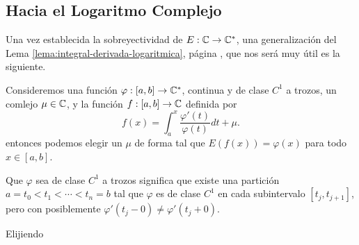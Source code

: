 \subsection{Hacia el Logaritmo Complejo}
Una vez establecida la sobreyectividad de \(E:\mathbb{C} \rightarrow \mathbb{C}^* \), una generalización del Lema \ref{lema:integral-derivada-logaritmica}, página 
\pageref{lema:integral-derivada-logaritmica}, que nos será muy útil es la siguiente.

\begin{theo}
    Consideremos una función \(\varphi : [a, b]\rightarrow \mathbb{C}^* \), continua y de clase \(C^1\) a trozos, un comlejo \(\mu \in \mathbb{C} \), y la función
    \(f: [a, b] \rightarrow \mathbb{C} \) definida por 
    \[
    \displaystyle f(x) = \int_{a}^{x} \frac{\varphi'(t)}{\varphi(t)} dt + \mu.
    \]
    entonces podemos elegir un \(\mu \) de forma tal que \(E(f(x)) = \varphi(x)\) para todo \(x\in [a,b]\).
\end{theo}
\begin{dem}
    Que \(\varphi\) sea de clase \(C^1\) a trozos significa que existe una partición \(a=t_0 < t_1 < \cdots < t_n = b\) tal que
    \(\varphi\) es de clase \(C^1\) en cada subintervalo \([t_j, t_{j+1}]\), pero con posiblemente \(\varphi'(t_j - 0) \neq \varphi'(t_j + 0)\).

    Elijiendo 
\end{dem}